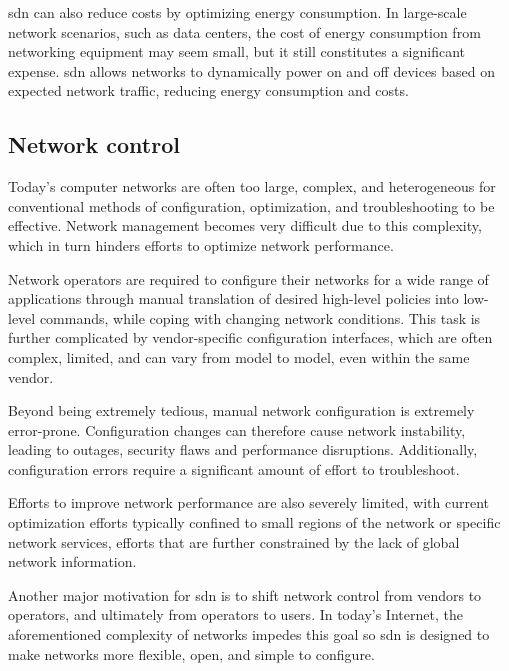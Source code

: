 \gls{sdn} can also reduce costs by optimizing energy consumption. In large-scale network scenarios, such as data centers, the cost of energy consumption from networking equipment may seem small, but it still constitutes a significant expense. \gls{sdn} allows networks to dynamically power on and off devices based on expected network traffic, reducing energy consumption and costs\cite{nunes_survey_2014}.

\subsection{Network control}
Today's computer networks are often too large, complex, and heterogeneous for conventional methods of configuration, optimization, and troubleshooting to be effective\cite{xia_survey_2015}\cite{kreutz_software-defined_2015}. Network management becomes very difficult due to this complexity, which in turn hinders efforts to optimize network performance.

Network operators are required to configure their networks for a wide range of applications through manual translation of desired high-level policies into low-level commands, while coping with changing network conditions. This task is further complicated by vendor-specific configuration interfaces, which are often complex, limited, and can vary from model to model, even within the same vendor\cite{feamster_road_2013}. 

Beyond being extremely tedious, manual network configuration is extremely error-prone. Configuration changes can therefore cause network instability, leading to outages, security flaws and performance disruptions\cite{nunes_survey_2014}. Additionally, configuration errors require a significant amount of effort to troubleshoot. 

Efforts to improve network performance are also severely limited, with current optimization efforts typically confined to small regions of the network or specific network services, efforts that are further constrained by the lack of global network information\cite{xia_survey_2015}.

Another major motivation for \gls{sdn} is to shift network control from vendors to operators, and ultimately from operators to users\cite{peterson_software-defined_2021}. In today's Internet, the aforementioned complexity of networks impedes this goal so \gls{sdn} is designed to make networks more flexible, open, and simple to configure.

